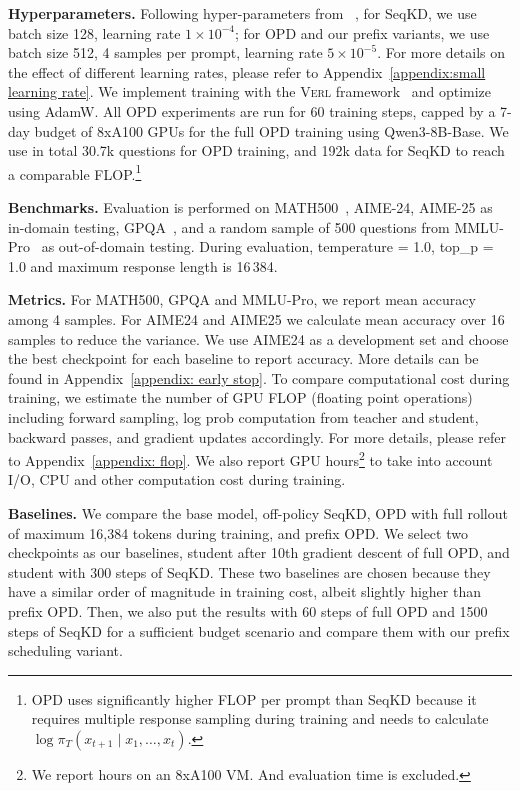 \documentclass[11pt]{article}
\begin{document}
\noindent \textbf{Hyperparameters.} Following hyper-parameters from ~\citet{lu2025onpolicydistillation}, for SeqKD, we use batch size 128, learning rate $1\times10^{-4}$; for OPD and our prefix variants, we use batch size 512, 4 samples per prompt, learning rate $5\times10^{-5}$. For more details on the effect of different learning rates, please refer to Appendix~\ref{appendix:small learning rate}. We implement training with the \textsc{Verl} framework~\cite{sheng2024hybridflow} and optimize using AdamW.    
All OPD experiments are run for 60 training steps, capped by a 7-day budget of 8xA100 GPUs for the full OPD training using Qwen3-8B-Base. 
We use in total 30.7k questions for OPD training, and 192k data for SeqKD to reach a comparable FLOP.\footnote{OPD uses significantly higher FLOP per prompt than SeqKD because it requires multiple response sampling during training and needs to calculate $\log \pi_T(x_{t+1}\mid x_1,\dots,x_t)$. }


\noindent \textbf{Benchmarks.} 
Evaluation is performed on \textsc{MATH}500~\citep{hendrycks2measuring}, AIME-24, AIME-25 as in-domain testing,  GPQA~\citep{rein2024gpqa}, and a random sample of 500 questions from MMLU-Pro~\cite{wang2024mmlu} as out-of-domain testing. During evaluation, temperature = 1.0, top\_p = 1.0 and maximum response length is 16\,384. 

\noindent \textbf{Metrics.} 
For MATH500, GPQA and MMLU-Pro, we report mean accuracy among 4 samples. For AIME24 and AIME25 we calculate mean accuracy over 16 samples to reduce the variance. We use AIME24 as a development set and choose the best checkpoint for each baseline to report accuracy. More details can be found in Appendix~\ref{appendix: early stop}.
To compare computational cost during training, we estimate the number of GPU \textsc{FLOP} (floating point operations) including forward sampling, log prob computation from teacher and student, backward passes, and gradient updates accordingly. For more details, please refer to Appendix~\ref{appendix: flop}.
We also report GPU hours\footnote{We report hours on an 8xA100 VM. And evaluation time is excluded.} to take into account I/O, CPU and other computation cost during training. 

\noindent \textbf{Baselines.} We compare the base model, off-policy SeqKD, OPD with full rollout of maximum 16,384 tokens during training, and prefix OPD. 
We select two checkpoints as our baselines, student after 10th gradient descent of full OPD, and student with 300 steps of SeqKD. These two baselines are chosen because they have a similar order of magnitude in training cost, albeit slightly higher than prefix OPD. 
Then, we also put the results with 60 steps of full OPD and 1500 steps of SeqKD for a  sufficient budget scenario and compare them with our prefix scheduling variant. 
\end{document}

